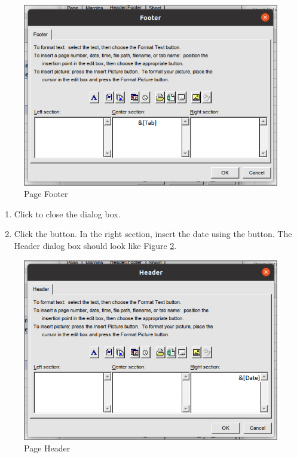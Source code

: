 \begin{figure}[H]
	\centering
	\includegraphics[width=\maxwidth{.95\linewidth}]{gfx/ch07_fig56}
	\caption{Page Footer}
	\label{07:fig56}
\end{figure}

\begin{enumerate}[resume]	
	\item Click  to close the  dialog box. 
	\item Click the  button. In the right section, insert the date using the  button. The Header dialog box should look like Figure \ref{07:fig57}.
\end{enumerate}

\begin{figure}[H]
	\centering
	\includegraphics[width=\maxwidth{.95\linewidth}]{gfx/ch07_fig57}
	\caption{Page Header}
	\label{07:fig57}
\end{figure}

